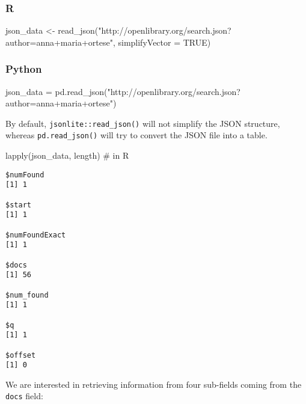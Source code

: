 \documentclass[
  letterpaper,
  DIV=11,
  numbers=noendperiod]{scrreprt}
\newenvironment{Shaded}{\begin{snugshade}}{\end{snugshade}}
\newcommand{\AttributeTok}[1]{\textcolor[rgb]{0.40,0.46,0.14}{#1}}
\newcommand{\CommentTok}[1]{\textcolor[rgb]{0.37,0.37,0.37}{#1}}
\newcommand{\ConstantTok}[1]{\textcolor[rgb]{0.56,0.35,0.01}{#1}}
\newcommand{\FunctionTok}[1]{\textcolor[rgb]{0.28,0.35,0.67}{#1}}
\newcommand{\NormalTok}[1]{\textcolor[rgb]{0.00,0.46,0.62}{#1}}
\newcommand{\OperatorTok}[1]{\textcolor[rgb]{0.37,0.37,0.37}{#1}}
\newcommand{\OtherTok}[1]{\textcolor[rgb]{0.00,0.46,0.62}{#1}}
\newcommand{\StringTok}[1]{\textcolor[rgb]{0.13,0.47,0.30}{#1}}
\begin{document}
\hypertarget{r-7}{%
\subsubsection{R}\label{r-7}}

\begin{Shaded}
\begin{Highlighting}[]
\NormalTok{json\_data }\OtherTok{\textless{}{-}} \FunctionTok{read\_json}\NormalTok{(}\StringTok{"http://openlibrary.org/search.json?author=anna+maria+ortese"}\NormalTok{,}
                       \AttributeTok{simplifyVector =} \ConstantTok{TRUE}\NormalTok{)}
\end{Highlighting}
\end{Shaded}

\hypertarget{python-7}{%
\subsubsection{Python}\label{python-7}}

\begin{Shaded}
\begin{Highlighting}[]
\NormalTok{json\_data }\OperatorTok{=}\NormalTok{ pd.read\_json(}\StringTok{"http://openlibrary.org/search.json?author=anna+maria+ortese"}\NormalTok{)}
\end{Highlighting}
\end{Shaded}

By default, \texttt{jsonlite::read\_json()} will not simplify the JSON
structure, whereas \texttt{pd.read\_json()} will try to convert the JSON
file into a table.

\begin{Shaded}
\begin{Highlighting}[]
\FunctionTok{lapply}\NormalTok{(json\_data, length) }\CommentTok{\# in R}
\end{Highlighting}
\end{Shaded}

\begin{verbatim}
$numFound
[1] 1

$start
[1] 1

$numFoundExact
[1] 1

$docs
[1] 56

$num_found
[1] 1

$q
[1] 1

$offset
[1] 0
\end{verbatim}

We are interested in retrieving information from four sub-fields coming
from the \texttt{docs} field:
\end{document}
